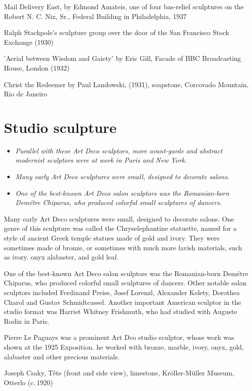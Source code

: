 Mail Delivery East, by Edmond Amateis, one of four bas-relief sculptures
on the Robert N. C. Nix, Sr., Federal Building in Philadelphia, 1937

Ralph Stackpole's sculpture group over the door of the San Francisco
Stock Exchange (1930)

'Aerial between Wisdom and Gaiety' by Eric Gill, Facade of BBC
Broadcasting House, London (1932)

Christ the Redeemer by Paul Landowski, (1931), soapstone, Corcovado
Mountain, Rio de Janeiro

\section{Studio sculpture}\label{studio-sculpture}

\begin{itemize}
\item
  \emph{Parallel with these Art Deco sculptors, more avant-garde and
  abstract modernist sculptors were at work in Paris and New York.}
\item
  \emph{Many early Art Deco sculptures were small, designed to decorate
  salons.}
\item
  \emph{One of the best-known Art Deco salon sculptors was the
  Romanian-born Demétre Chiparus, who produced colorful small sculptures
  of dancers.}
\end{itemize}

Many early Art Deco sculptures were small, designed to decorate salons.
One genre of this sculpture was called the Chryselephantine statuette,
named for a style of ancient Greek temple statues made of gold and
ivory. They were sometimes made of bronze, or sometimes with much more
lavish materials, such as ivory. onyx alabaster, and gold leaf.

One of the best-known Art Deco salon sculptors was the Romanian-born
Demétre Chiparus, who produced colorful small sculptures of dancers.
Other notable salon sculptors included Ferdinand Preiss, Josef Lorenzl,
Alexander Kelety, Dorothea Charol and Gustav Schmidtcassel. Another
important American sculptor in the studio format was Harriet Whitney
Frishmuth, who had studied with Auguste Rodin in Paris.

Pierre Le Paguays was a prominent Art Dco studio sculptor, whose work
was shown at the 1925 Exposition. he worked with bronze, marble, ivory,
onyx, gold, alabaster and other precious materials.

Joseph Csaky, Tête (front and side view), limestone, Kröller-Müller
Museum, Otterlo (c. 1920)

